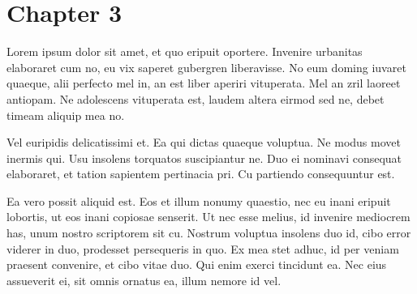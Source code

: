 \chapter{Chapter 3}
\label{chapter:maintext2}


Lorem ipsum dolor sit amet, et quo eripuit oportere. Invenire urbanitas elaboraret cum no, eu vix saperet gubergren liberavisse. No eum doming iuvaret quaeque, alii perfecto mel in, an est liber aperiri vituperata. Mel an zril laoreet antiopam. Ne adolescens vituperata est, laudem altera eirmod sed ne, debet timeam aliquip mea no.

Vel euripidis delicatissimi et. Ea qui dictas quaeque voluptua. Ne modus movet inermis qui. Usu insolens torquatos suscipiantur ne. Duo ei nominavi consequat elaboraret, et tation sapientem pertinacia pri. Cu partiendo consequuntur est.

Ea vero possit aliquid est. Eos et illum nonumy quaestio, nec eu inani eripuit lobortis, ut eos inani copiosae senserit. Ut nec esse melius, id invenire mediocrem has, unum nostro scriptorem sit cu. Nostrum voluptua insolens duo id, cibo error viderer in duo, prodesset persequeris in quo. Ex mea stet adhuc, id per veniam praesent convenire, et cibo vitae duo. Qui enim exerci tincidunt ea. Nec eius assueverit ei, sit omnis ornatus ea, illum nemore id vel.